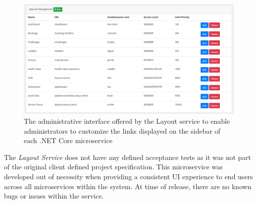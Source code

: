 \begin{figure}[H]
    \centering
    \includegraphics[width=\textwidth]{Images/service_cms.png}
    \caption{The administrative interface offered by the Layout service to enable administrators to customize the links displayed on the sidebar of each .NET Core microservice}
\end{figure}

The \textit{Layout Service} does not have any defined acceptance tests as it was not part of the original client defined project specification. This microservice was developed out of necessity when providing a consistent UI experience to end users across all microservices within the system. At time of release, there are no known bugs or issues within the service.